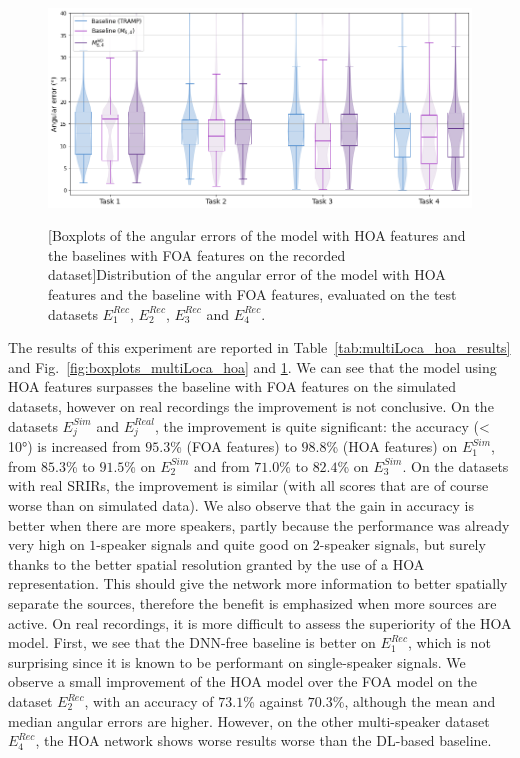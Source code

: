 \begin{figure}[t]
    \centering
    \begin{adjustbox}{width=1.3\textwidth,center}
        \includegraphics[width=1.\textwidth]{Images/chap7/boxplots_hoa_locata.png}
    \end{adjustbox}
    
    [Boxplots of the angular errors of the model with HOA features and the baselines with FOA features on the recorded dataset]{Distribution of the angular error of the model with HOA features and the baseline with FOA features, evaluated on the test datasets $E^{Rec}_1$, $E^{Rec}_2$, $E^{Rec}_3$ and $E^{Rec}_4$.}
    \label{fig:boxplots_multiLoca_hoa_locata}
\end{figure}

The results of this experiment are reported in Table~\ref{tab:multiLoca_hoa_results} and Fig.~\ref{fig:boxplots_multiLoca_hoa} and \ref{fig:boxplots_multiLoca_hoa_locata}. We can see that the model using HOA features surpasses the baseline with FOA features on the simulated datasets, however on real recordings the improvement is not conclusive. On the datasets $E^{Sim}_j$ and $E^{Real}_j$, the improvement is quite significant: the accuracy (< 10°) is increased from $95.3$\% (FOA features) to $98.8$\% (HOA features) on $E^{Sim}_1$, from $85.3$\% to $91.5$\% on $E^{Sim}_2$ and from $71.0$\% to $82.4$\% on $E^{Sim}_3$. On the datasets with real SRIRs, the improvement is similar (with all scores that are of course worse than on simulated data). We also observe that the gain in accuracy is better when there are more speakers, partly because the performance was already very high on $1$-speaker signals and quite good on $2$-speaker signals, but surely thanks to the better spatial resolution granted by the use of a HOA representation. This should give the network more information to better spatially separate the sources, therefore the benefit is emphasized when more sources are active. On real recordings, it is more difficult to assess the superiority of the HOA model. First, we see that the DNN-free baseline is better on $E^{Rec}_1$, which is not surprising since it is known to be performant on single-speaker signals. We observe a small improvement of the HOA model over the FOA model on the dataset $E^{Rec}_2$, with an accuracy of $73.1$\% against $70.3$\%, although the mean and median angular errors are higher. However, on the other multi-speaker dataset $E^{Rec}_4$, the HOA network shows worse results worse than the DL-based baseline.

